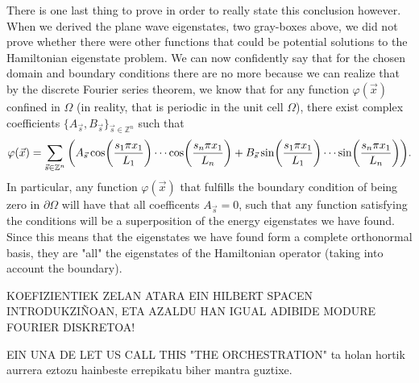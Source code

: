 \documentclass[11pt, a4paper]{article} %
\newcommand{\Z}{\mathbb{Z}} %
\begin{document}
There is one last thing to prove in order to really state this conclusion however. When we derived the plane wave eigenstates, two gray-boxes above, we did not prove whether there were other functions that could be potential solutions to the Hamiltonian eigenstate problem. We can now confidently say that for the chosen domain and boundary conditions there are no more because we can realize that by the discrete Fourier series theorem, we know that for any function $\varphi(\vec{x})$ confined in $\Omega$ (in reality, that is periodic in the unit cell $\Omega$), there exist complex coefficients $\{A_{\vec{s}}, B_{\vec{s}}\}_{\vec{s}\in\Z^n}$ such that
\begin{equation}
\varphi(\vec{x})=\sum_{\vec{s}\in\Z^n}\qty(A_{\vec{s}}\cos(\frac{s_1\pi x_1}{L_1})\cdots \cos(\frac{s_n\pi x_1}{L_n})+ B_{\vec{s}}\sin(\frac{s_1\pi x_1}{L_1})\cdots \sin(\frac{s_n\pi x_1}{L_n})).
\end{equation}
In particular, any function $\varphi(\vec{x})$ that fulfills the boundary condition of being zero in $\partial \Omega$ will have that all coefficents $A_{\vec{s}}=0$, such that any function satisfying the conditions will be a superposition of the energy eigenstates we have found. Since this means that the eigenstates we have found form a complete orthonormal basis, they are "all" the eigenstates of the Hamiltonian operator (taking into account the boundary).

KOEFIZIENTIEK ZELAN ATARA EIN HILBERT SPACEN INTRODUKZIÑOAN, ETA AZALDU HAN IGUAL ADIBIDE MODURE FOURIER DISKRETOA!

EIN UNA DE LET US CALL THIS "THE ORCHESTRATION" ta holan hortik aurrera eztozu hainbeste errepikatu biher mantra guztixe.


 
\end{document}
